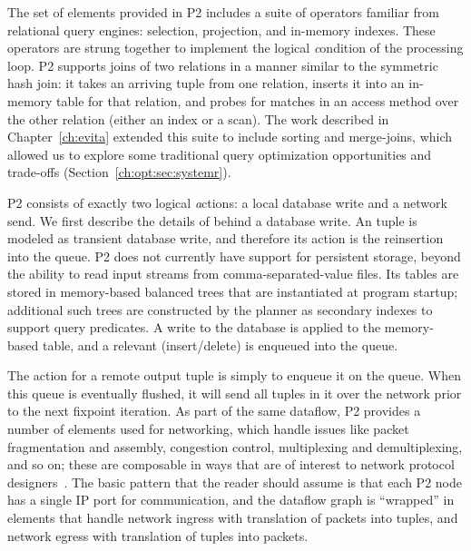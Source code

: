 The set of elements provided in P2 includes a suite of operators familiar from
relational query engines: selection, projection, and in-memory indexes.  These
operators are strung together to implement the logical {\emph condition} of the 
processing loop.  P2 supports joins of two relations in a manner similar to the
symmetric hash join: it takes an arriving tuple from one relation, inserts it
into an in-memory table for that relation, and probes for matches in an access
method over the other relation (either an index or a scan).  The work described
in Chapter~\ref{ch:evita} extended this suite to include sorting and
merge-joins, which allowed us to explore some traditional query optimization
opportunities and trade-offs (Section~\ref{ch:opt:sec:systemr}).

P2 consists of exactly two logical {\emph actions}: a local database write and
a network send.  We first describe the details of behind a database write.  An
 tuple is modeled as transient database write, and therefore its
action is the reinsertion into the  queue.  P2 does not currently
have support for persistent storage, beyond the ability to read input streams
from comma-separated-value files.  Its tables are stored in memory-based
balanced trees that are instantiated at program startup; additional such trees
are constructed by the planner as secondary indexes to support query
predicates.  A write to the database is applied to the memory-based table, and
a relevant (insert/delete)  is enqueued into the  queue.

The action for a remote output tuple is simply to enqueue it on the 
queue.  When this queue is eventually flushed, it will send all tuples in it
over the network prior to the next fixpoint iteration.  As part of the same
dataflow, P2 provides a number of elements used for networking, which handle
issues like packet fragmentation and assembly, congestion control, multiplexing
and demultiplexing, and so on; these are composable in ways that are of
interest to network protocol designers~\cite{condie-hotnets05}.  The basic
pattern that the reader should assume is that each P2 node has a single IP port
for communication, and the dataflow graph is ``wrapped'' in elements that
handle network ingress with translation of packets into tuples, and network
egress with translation of tuples into packets.


